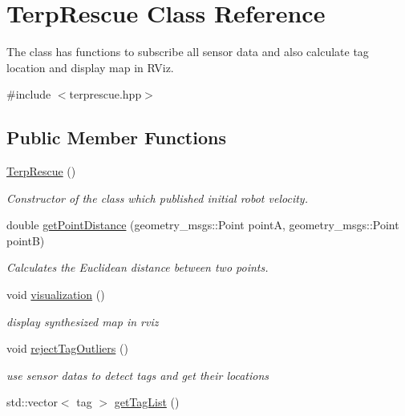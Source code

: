 \hypertarget{classTerpRescue}{}\section{Terp\+Rescue Class Reference}
\label{classTerpRescue}


The class has functions to subscribe all sensor data and also calculate tag location and display map in R\+Viz.  




{\ttfamily \#include $<$terprescue.\+hpp$>$}

\subsection*{Public Member Functions}
\begin{DoxyCompactItemize}
\item 
\mbox{\label{classTerpRescue_acf8ace51475d84de22e3b590b1d4acf2}} 
\hyperlink{classTerpRescue_acf8ace51475d84de22e3b590b1d4acf2}{Terp\+Rescue} ()
\begin{DoxyCompactList}\small\item\em Constructor of the class which published initial robot velocity. \end{DoxyCompactList}\item 
double \hyperlink{classTerpRescue_aa0f293d50d30f9e3b0fab412e3392ffd}{get\+Point\+Distance} (geometry\+\_\+msgs\+::\+Point pointA, geometry\+\_\+msgs\+::\+Point pointB)
\begin{DoxyCompactList}\small\item\em Calculates the Euclidean distance between two points. \end{DoxyCompactList}\item 
void \hyperlink{classTerpRescue_ae961a3e24e9ecd48ca2d8bb377955e46}{visualization} ()
\begin{DoxyCompactList}\small\item\em display synthesized map in rviz \end{DoxyCompactList}\item 
void \hyperlink{classTerpRescue_af95c5deb5e883e5986f957f42a89041e}{reject\+Tag\+Outliers} ()
\begin{DoxyCompactList}\small\item\em use sensor datas to detect tags and get their locations \end{DoxyCompactList}\item 
std\+::vector$<$ tag $>$ \hyperlink{classTerpRescue_ae1d56c14d74089c5e779cf94ed20adf9}{get\+Tag\+List} ()

\end{DoxyCompactItemize}
